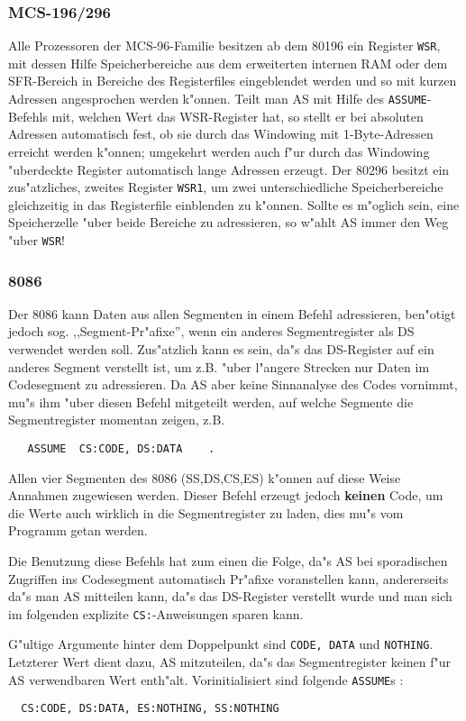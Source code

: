 \documentclass[12pt,a4paper,twoside]{report}
\newcommand{\bb}[1]{{\bf #1}}
\newcommand{\tty}[1]{{\tt #1}}
\begin{document}

\subsubsection{MCS-196/296}

Alle Prozessoren der MCS-96-Familie besitzen ab dem 80196 ein Register \tty{WSR},
mit dessen Hilfe Speicherbereiche aus dem erweiterten internen RAM
oder dem SFR-Bereich in Bereiche des Registerfiles eingeblendet werden
und so mit kurzen Adressen angesprochen werden k"onnen.  Teilt man AS
mit Hilfe des \tty{ASSUME}-Befehls mit, welchen Wert das WSR-Register
hat, so stellt er bei absoluten Adressen automatisch fest, ob  sie
durch das Windowing mit 1-Byte-Adressen erreicht werden k"onnen;
umgekehrt werden auch f"ur durch das Windowing "uberdeckte Register
automatisch lange Adressen erzeugt.  Der 80296 besitzt ein zus"atzliches,
zweites Register \tty{WSR1}, um zwei unterschiedliche Speicherbereiche
gleichzeitig in das Registerfile einblenden zu k"onnen.  Sollte
es m"oglich sein, eine Speicherzelle "uber beide Bereiche zu adressieren,
so w"ahlt AS immer den Weg "uber \tty{WSR}!


\subsubsection{8086}

Der 8086 kann Daten aus allen Segmenten in einem Befehl adressieren,
ben"otigt jedoch sog. ,,Segment-Pr"afixe'', wenn ein anderes Segmentregister
als DS verwendet werden soll.  Zus"atzlich kann es sein, da"s das
DS-Register auf ein anderes Segment verstellt ist, um z.B. "uber l"angere
Strecken nur Daten im Codesegment zu adressieren.  Da AS aber keine
Sinnanalyse des Codes vornimmt, mu"s ihm "uber diesen Befehl mitgeteilt
werden, auf welche Segmente die Segmentregister momentan zeigen, z.B.
\begin{verbatim}
   ASSUME  CS:CODE, DS:DATA    .
\end{verbatim}
Allen vier Segmenten des 8086 (SS,DS,CS,ES) k"onnen auf diese Weise Annahmen
zugewiesen werden.  Dieser Befehl erzeugt jedoch \bb{keinen} Code, um
die Werte auch wirklich in die Segmentregister zu laden, dies mu"s vom
Programm getan werden.
\par
Die Benutzung diese Befehls hat zum einen die Folge, da"s AS bei
sporadischen Zugriffen ins Codesegment automatisch Pr"afixe voranstellen
kann, andererseits da"s man AS mitteilen kann, da"s das DS-Register verstellt
wurde und man sich im folgenden explizite \tty{CS:}-Anweisungen sparen
kann.
\par
G"ultige Argumente hinter dem Doppelpunkt sind \tty{CODE, DATA} und
\tty{NOTHING}.  Letzterer Wert dient dazu, AS mitzuteilen, da"s das
Segmentregister keinen f"ur AS verwendbaren Wert enth"alt.
Vorinitialisiert sind folgende \tty{ASSUME}s :
\begin{verbatim}
  CS:CODE, DS:DATA, ES:NOTHING, SS:NOTHING
\end{verbatim}
\end{document}
